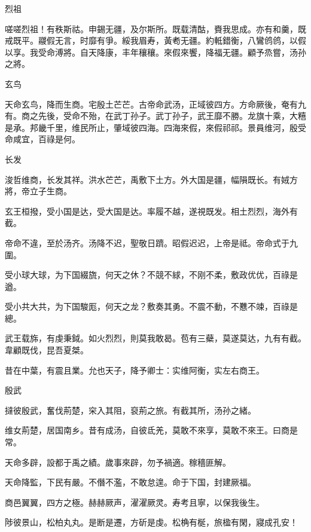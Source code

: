 烈祖

嗟嗟烈祖！有秩斯祜。申錫无疆，及尔斯所。既载清酤，賚我思成。亦有和羹，既戒既平。鬷假无言，时靡有爭。綏我眉寿，黃耇无疆。約軧錯衡，八鸞鸧鸧，以假以享。我受命溥將。自天降康，丰年穰穰。來假來饗，降福无疆。顧予烝嘗，汤孙之將。

玄鸟

天命玄鸟，降而生商。宅殷土芒芒。古帝命武汤，正域彼四方。方命厥後，奄有九有。商之先後，受命不殆，在武丁孙子。武丁孙子，武王靡不勝。龙旗十乘，大糦是承。邦畿千里，维民所止，肇域彼四海。四海來假，來假祁祁。景員维河，殷受命咸宜，百祿是何。

长发

浚哲维商，长发其祥。洪水芒芒，禹敷下土方。外大国是疆，幅隕既长。有娀方將，帝立子生商。

玄王桓撥，受小国是达，受大国是达。率履不越，遂視既发。相土烈烈，海外有截。

帝命不違，至於汤齐。汤降不迟，聖敬日躋。昭假迟迟，上帝是祗。帝命式于九圍。

受小球大球，为下国綴旒，何天之休？不競不絿，不刚不柔，敷政优优，百祿是遒。

受小共大共，为下国駿厖，何天之龙？敷奏其勇。不震不動，不戁不竦，百祿是總。

武王载旆，有虔秉鉞。如火烈烈，則莫我敢曷。苞有三蘗，莫遂莫达，九有有截。韋顧既伐，昆吾夏桀。

昔在中葉，有震且業。允也天子，降予卿士：实维阿衡，实左右商王。

殷武

撻彼殷武，奮伐荊楚，穼入其阻，裒荊之旅。有截其所，汤孙之緒。

维女荊楚，居国南乡。昔有成汤，自彼氐羌，莫敢不來享，莫敢不來王。曰商是常。

天命多辟，設都于禹之績。歲事來辟，勿予禍適。稼穡匪解。

天命降監，下民有嚴。不僭不濫，不敢怠遑。命于下国，封建厥福。

商邑翼翼，四方之極。赫赫厥声，濯濯厥灵。寿考且寧，以保我後生。

陟彼景山，松柏丸丸。是断是遷，方斫是虔。松桷有梴，旅楹有閑，寢成孔安！

